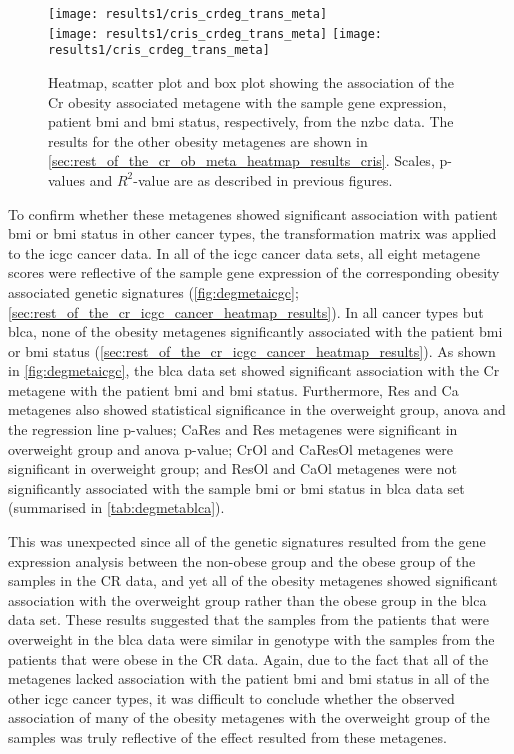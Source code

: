 \begin{figure}[htp!]
	\centering
	\texttt{[image: results1/cris\_crdeg\_trans\_meta]}\\
	\vspace{1em}
	\texttt{[image: results1/cris\_crdeg\_trans\_meta]}
	\hfill
	\texttt{[image: results1/cris\_crdeg\_trans\_meta]}
	\caption[Cr obesity metagene in the \gls{nzbc} data]{Heatmap, scatter plot and box plot showing the association of the Cr obesity associated metagene with the sample gene expression, patient \gls{bmi} and \gls{bmi} status, respectively, from the \gls{nzbc} data.
	The results for the other obesity metagenes are shown in \cref{sec:rest_of_the_cr_ob_meta_heatmap_results_cris}.
	Scales, p-values and $R^2$-value are as described in previous figures.}
	\label{fig:degmetaprint}
\end{figure}

To confirm whether these metagenes showed significant association with patient \gls{bmi} or \gls{bmi} status in other cancer types, the transformation matrix was applied to the \gls{icgc} cancer data.
In all of the \gls{icgc} cancer data sets, all eight metagene scores were reflective of the sample gene expression of the corresponding obesity associated genetic signatures (\cref{fig:degmetaicgc}; \cref{sec:rest_of_the_cr_icgc_cancer_heatmap_results}).
In all cancer types but \gls{blca}, none of the obesity metagenes significantly associated with the patient \gls{bmi} or \gls{bmi} status (\cref{sec:rest_of_the_cr_icgc_cancer_heatmap_results}).
As shown in \cref{fig:degmetaicgc}, the \gls{blca} data set showed significant association with the Cr metagene with the patient \gls{bmi} and \gls{bmi} status.
Furthermore, Res and Ca metagenes also showed statistical significance in the overweight group, \gls{anova} and the regression line p-values; CaRes and Res metagenes were significant in overweight group and \gls{anova} p-value; CrOl and CaResOl metagenes were significant in overweight group; and ResOl and CaOl metagenes were not significantly associated with the sample \gls{bmi} or \gls{bmi} status in \gls{blca} data set (summarised in \cref{tab:degmetablca}).

This was unexpected since all of the genetic signatures resulted from the  gene expression analysis between the non-obese group and the obese group of the samples in the CR data, and yet all of the obesity metagenes showed significant association with the overweight group rather than the obese group in the \gls{blca} data set.
These results suggested that the samples from the patients that were overweight in the \gls{blca} data were similar in genotype with the samples from the patients that were obese in the CR data.
Again, due to the fact that all of the metagenes lacked association with the patient \gls{bmi} and  \gls{bmi} status in all of the other \gls{icgc} cancer types, it was difficult to conclude whether the observed association of many of the obesity metagenes with the overweight group of the samples was truly reflective of the effect resulted from these metagenes.

